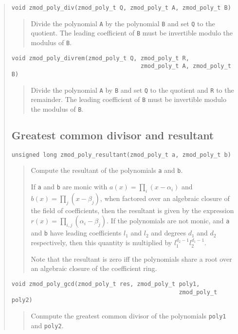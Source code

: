 \documentclass[a4paper,10pt]{article}
\newcommand{\code}{\lstinline}
\begin{document}
\begin{quote}
\begin{lstlisting}
void zmod_poly_div(zmod_poly_t Q, zmod_poly_t A, zmod_poly_t B)
\end{lstlisting}
\begin{quote}
Divide the polynomial \code{A} by the polynomial \code{B} and set \code{Q} to the quotient. The leading coefficient of \code{B} must be invertible modulo the modulus of \code{B}.
\end{quote}

\begin{lstlisting}
void zmod_poly_divrem(zmod_poly_t Q, zmod_poly_t R, 
                                     zmod_poly_t A, zmod_poly_t B)
\end{lstlisting}
\begin{quote}
Divide the polynomial \code{A} by \code{B} and set \code{Q} to the quotient and \code{R} to the remainder. The leading coefficient of \code{B} must be invertible modulo the modulus of \code{B}.
\end{quote}

\subsection{Greatest common divisor and resultant}
\begin{lstlisting}
unsigned long zmod_poly_resultant(zmod_poly_t a, zmod_poly_t b)
\end{lstlisting}
\begin{quote}
Compute the resultant of the polynomials \code{a} and \code{b}. 

If \code{a} and \code{b} are monic with $a(x) = \prod_i (x - \alpha_i)$ and $b(x) = \prod_j (x - \beta_j)$, when factored over an algebraic closure of the field of coefficients, then the resultant is given by the expression $r(x) = \prod_{i,j} (\alpha_i - \beta_j)$. If the polynomials are not monic, and \code{a} and \code{b} have leading coefficients $l_1$ and $l_2$ and degrees $d_1$ and $d_2$ respectively, then this quantity is multiplied by $l_1^{d_2-1}l_2^{d_1-1}$.

Note that the resultant is zero iff the polynomials share a root over an algebraic closure of the coefficient ring.

\end{quote}

\begin{lstlisting}
void zmod_poly_gcd(zmod_poly_t res, zmod_poly_t poly1, 
                                                zmod_poly_t poly2)
\end{lstlisting}
\begin{quote}
Conmpute the greatest common divisor of the polynomials \code{poly1} and \code{poly2}.
\end{quote}


\end{quote}
\end{document}
